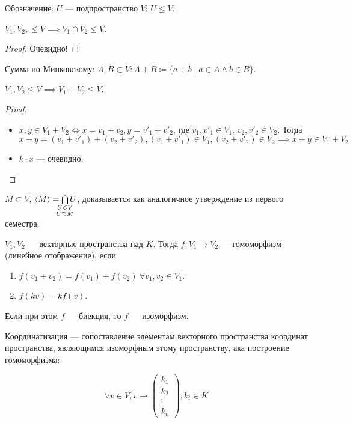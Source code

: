 Обозначение: $U$ --- подпространство  $V$:  $U \le V$.

\begin{statement}
    $V_1, V_2, \le V \implies V_1 \cap V_2 \le V$.
\end{statement}
\begin{proof}
    Очевидно!
\end{proof}
\begin{definition}
   Сумма по Минковскому: $A, B \subset V\!: A + B \coloneqq \{a + b \mid a \in A \land b \in B\}$. 
\end{definition}
\begin{statement}
    $V_1, V_2 \le V \implies V_1 + V_2 \le V$.
\end{statement}
\begin{proof}
    \slashn
    \begin{itemize}
	    \item $x, y \in V_1 + V_2 \iff x = v_1 + v_2, y = v'_1 + v'_2$, где $v_1, v'_1 \in V_1$, $v_2, v'_2 \in V_2$. Тогда $x + y = (v_1 + v'_1) + (v_2 + v'_2), (v_1 + v'_1) \in V_1, (v_2 + v'_2) \in V_2 \implies x + y \in V_1 + V_2$
        \item $k \cdot x$ --- очевидно.
    \end{itemize}
\end{proof}
\begin{remark}
    $M \subset V$,  $\langle M \rangle = \bigcap\limits_{\mathclap{\substack{U \le V \\ U \supset M}}} U$, доказывается как аналогичное утверждение из первого семестра.
\end{remark}
\begin{definition}
    $V_1, V_2$ --- векторные пространства над $K$. Тогда  $f\!: V_1 \to V_2$ --- гомоморфизм (линейное отображение), если 
    \begin{enumerate}
        \item $f(v_1+v_2) = f(v_1) + f(v_2)\ \forall v_1, v_2 \in V_1$.
        \item $f(kv) = k f(v)$.
    \end{enumerate}

    Если при этом $f$ --- биекция, то  $f$ --- изоморфизм.
\end{definition}
\begin{definition}
    Координатизация --- сопоставление элементам векторного пространства координат пространства, являющимся изоморфным этому пространству, ака построение гомоморфизма:

$$
\forall v \in V, v \to \begin{pmatrix} k_1 \\ k_2 \\ \vdots \\ k_n \end{pmatrix} , k_i \in K
$$
\end{definition}

